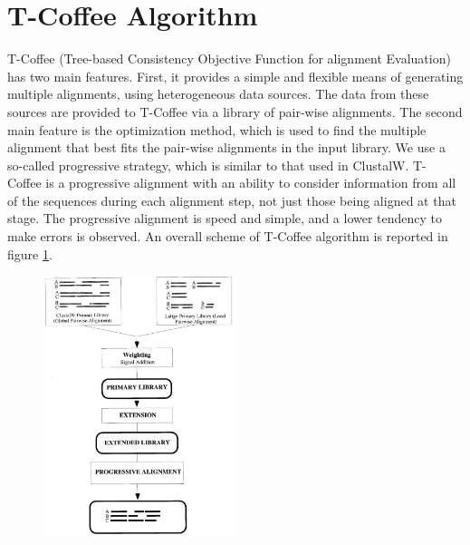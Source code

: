 \section{T-Coffee Algorithm}
T-Coffee (Tree-based Consistency Objective Function for alignment Evaluation) has two main features. First, it provides a simple and flexible means of generating multiple alignments, using heterogeneous data sources. The data from these sources are provided to T-Coffee via a library of pair-wise alignments. 
The second main feature is the optimization method, which is used to find the multiple alignment that best fits the pair-wise alignments in the input library. We use a so-called progressive strategy, which is similar to that used in ClustalW. T- Coffee is a progressive alignment with an ability to consider information from all of the sequences during each alignment step, not just those being aligned at that stage. The progressive alignment is speed and simple, and a lower tendency to make errors is observed.
An overall scheme of T-Coffee algorithm is reported in figure \ref{fig:tcoffee}.

\begin{figure}[ht]
		\centering
		\includegraphics[width=0.5\textwidth]{tcoffee}
		\caption{\label{fig:tcoffee}}
	\end{figure}
	
